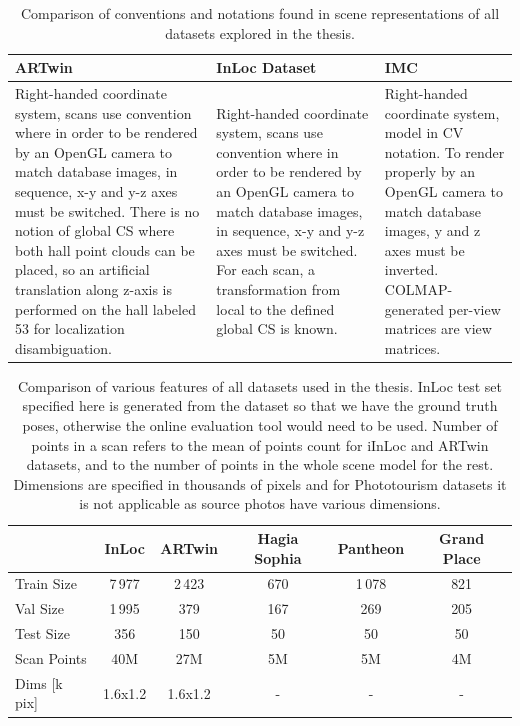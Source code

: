 \begin{table}
\caption{Comparison of conventions and notations found in scene representations of all
datasets explored in the thesis.}
\centering
    \begin{tabular}{p{4cm} p{4cm} p{4cm}}
    \toprule
    ARTwin & InLoc Dataset & IMC \\
    \midrule
    Right-handed coordinate system, scans use convention where in order to be
    rendered by an OpenGL camera to match database images, in sequence, x-y and y-z axes
    must be switched. There is no notion of global CS where both hall point clouds can be
    placed, so an artificial translation along z-axis is performed on the hall labeled 53
    for localization disambiguation. & Right-handed coordinate system, scans use
    convention where in order to be rendered by an OpenGL camera to match database images,
    in sequence, x-y and y-z axes must be switched. For each scan, a transformation from
    local to the defined global CS is known. & Right-handed coordinate system, model in CV
    notation. To render properly by an OpenGL camera to match database images, y and z
    axes must be inverted.  COLMAP-generated per-view matrices are view matrices.\\
    \bottomrule
    \end{tabular}
\label{tab:model_conventions}
\end{table}

\begin{table}
\caption{Comparison of various features of all datasets used in the thesis.
InLoc test set specified here is generated from the dataset so that we have the ground
truth poses, otherwise the online evaluation tool would need to be used. Number of points
in a scan refers to the mean of points count for iInLoc and ARTwin datasets, and to the
number of points in the whole scene model for the rest. Dimensions are specified in
thousands of pixels and for Phototourism datasets it is not applicable as source photos
have various dimensions.}
\centering
    \begin{tabular}{l c c c c c}
    \toprule
     & InLoc & ARTwin & Hagia Sophia & Pantheon & Grand Place\\
    \midrule
    Train Size  &	7\,977 	& 2\,423    & 670 & 1\,078  & 821\\
    Val Size    &	1\,995	& 379       & 167 & 269     & 205\\
    Test Size   &	356	    & 150       & 50  & 50		& 50\\
    Scan Points	&   40M     & 27M       & 5M  & 5M		& 4M\\
    Dims [k pix]& 1.6x1.2	& 1.6x1.2	& -   & -		& -\\
    \bottomrule
    \end{tabular}
\label{tab:datasets}
\end{table}
